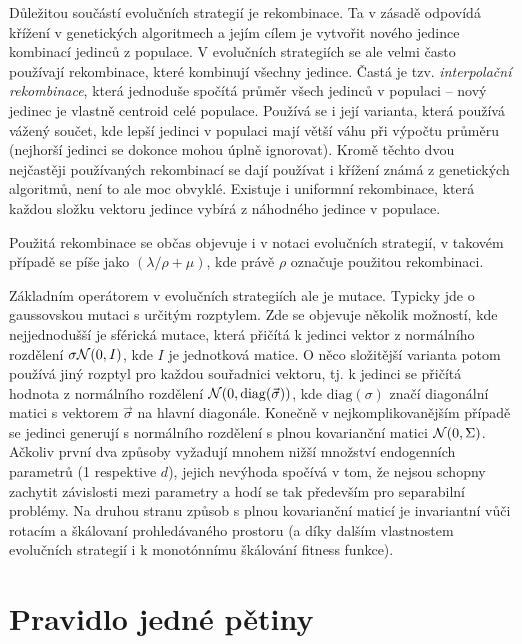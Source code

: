 Důležitou součástí evolučních strategií je rekombinace. Ta v zásadě odpovídá křížení v genetických algoritmech a jejím cílem je vytvořit nového jedince kombinací jedinců z populace. V evolučních strategiích se ale velmi často používají rekombinace, které kombinují všechny jedince. Častá je tzv. \emph{interpolační rekombinace}, která jednoduše spočítá průměr všech jedinců v populaci -- nový jedinec je vlastně centroid celé populace. Používá se i její varianta, která používá vážený součet, kde lepší jedinci v populaci mají větší váhu při výpočtu průměru (nejhorší jedinci se dokonce mohou úplně ignorovat). Kromě těchto dvou nejčastěji používaných rekombinací se dají používat i křížení známá z genetických algoritmů, není to ale moc obvyklé. Existuje i uniformní rekombinace, která každou složku vektoru jedince vybírá z náhodného jedince v populace. 

Použitá rekombinace se občas objevuje i v notaci evolučních strategií, v takovém případě se píše jako $(\lambda/\rho + \mu)$, kde právě $\rho$ označuje použitou rekombinaci.

Základním operátorem v evolučních strategiích ale je mutace. Typicky jde o gaussovskou mutaci s určitým rozptylem. Zde se objevuje několik možností, kde nejjednodušší je sférická mutace, která přičítá k jedinci vektor z normálního rozdělení $\sigma\mathcal{N}(0, I)$, kde $I$ je jednotková matice. O něco složitější varianta potom používá jiný rozptyl pro každou souřadnici vektoru, tj. k jedinci se přičítá hodnota z normálního rozdělení $\mathcal{N}(0, \mathrm{diag}({\vec{\sigma}}))$, kde $\mathrm{diag}(\sigma)$ značí diagonální matici s vektorem $\vec{\sigma}$ na hlavní diagonále. Konečně v nejkomplikovanějším případě se jedinci generují s normálního rozdělení s plnou kovarianční matici $\mathcal{N}(0, \Sigma)$. Ačkoliv první dva způsoby vyžadují mnohem nižší množství endogenních parametrů (1 respektive $d$), jejich nevýhoda spočívá v tom, že nejsou schopny zachytit závislosti mezi parametry a hodí se tak především pro separabilní problémy. Na druhou stranu způsob s plnou kovarianční maticí je invariantní vůči rotacím a škálovaní prohledávaného prostoru (a díky dalším vlastnostem evolučních strategií i k monotónnímu škálování fitness funkce).

\newcommand{\fifth}{\sfrac{1}{5}\xspace}

\section{Pravidlo jedné pětiny}

